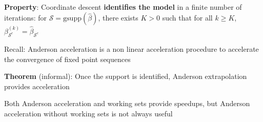 \documentclass[english,final,t]{beamer}
\newcommand{\cS}{\mathcal{S}}
\begin{document}
\begin{frame}{}
\begin{columns}[t]
\begin{column}{.3\linewidth}
\begin{block}{\textbf{\color{malgared}{\# 2 Support Identification}}}
		 \vspace{0.5em}

		\textbf{\color{malgared}Property}:  Coordinate descent \textbf{identifies the model} in a finite number of iterations: for $\cS = \mathrm{gsupp}(\hat \beta)$, there exists $K>0$ such that for all $k\geq K$, $\beta_{\cS^c}^{(k)} = \hat \beta_{\cS^c}$
		\end{block}
	\begin{block}{\textbf{\color{malgared}{\# 3 Anderson Acceleration}}}

		{\color{malgared}Recall}: Anderson acceleration is a non linear acceleration procedure to accelerate the convergence of fixed point sequences

		\textbf{\color{malgared}Theorem} (informal): Once the support is identified, Anderson extrapolation provides acceleration

		\begin{center}
		\end{center}

		Both Anderson acceleration and working sets provide speedups, but
		Anderson acceleration without working sets is not always useful


\end{block}
\end{column}
\end{columns}
\end{frame}
\end{document}
